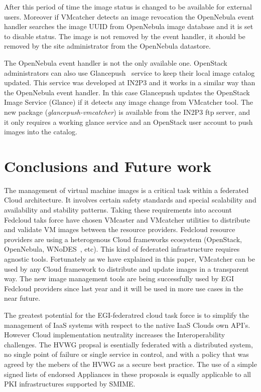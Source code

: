 \documentclass{cai}
\begin{document}
After this period of time the image status is changed to be available for external users. 
Moreover if VMcatcher detects an image revocation the OpenNebula event handler searches the image UUID from OpenNebula image database and it is set to disable status.
The image is not removed by the event handler, it should be removed by the site administrator from the OpenNebula datastore.

The OpenNebula event handler is not the only available one. OpenStack administrators can also use Glancepush~\cite{glancepush} service to keep their local image catalog updated. 
This service was developed at IN2P3 and it works in a similar way than the OpenNebula event handler. 
In this case Glancepush updates the OpenStack Image Service (Glance) if it detects any image change from VMcatcher tool. 
The new package (\textit{glancepush-vmcatcher}) is available from the IN2P3 ftp server, and it only requires a working glance service and an OpenStack user account to push images into the catalog.


\section{Conclusions and Future work}
\label{sect-conclusions}
The management of virtual machine images is a critical task within a federated Cloud architecture. It involves certain safety standards and special scalability and availability and stability patterns.
Taking these requirements into account Fedcloud taks force have chosen VMcaster and VMcatcher utilities to distribute and validate VM images between the resource providers.
Fedcloud resource providers are using a heterogenous Cloud frameworks ecosystem (OpenStack, OpenNebula, WNoDES~\cite{wnodes}, etc). This kind of federated infrastructure requires agnostic tools.
Fortunately as we have explained in this paper, VMcatcher can be used by any Cloud framework to distribute and update images in a transparent way. 
The new image management tools are being successfully used by EGI Fedcloud providers since last year and it will be used in more use cases in the near future.

The greatest potential for the EGI-federatred cloud task force is to simplify the management of IaaS systems with respect to the native IaaS Clouds own API's. 
However Cloud implementation neutrality increases the Interoperability challenges. 
The HVWG propsal is esentially federated with a distributed system, no single point of failure or single service in control, and with a policy that was agreed by the mebers of the HVWG as a secure best practice.
The use of a simple signed lists of endorsed Appliances in these proposals is equally applicable to all PKI infrastructures supported by SMIME. 
\end{document}
